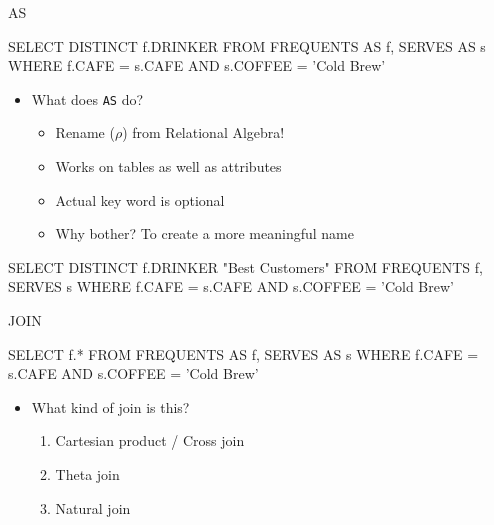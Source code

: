 \documentclass[aspectratio=169]{beamer}
\begin{document}
\begin{frame}[fragile]{AS}

\begin{SQL}
SELECT DISTINCT f.DRINKER
FROM FREQUENTS AS f, SERVES AS s
WHERE f.CAFE = s.CAFE AND s.COFFEE = 'Cold Brew'
\end{SQL}

\begin{itemize}
\item What does \texttt{AS} do?
\begin{itemize}
\item Rename ($\rho$) from Relational Algebra!
\item Works on tables as well as attributes
\item Actual key word is optional
\item Why bother? To create a more meaningful name
\end{itemize}
\end{itemize}

\begin{SQL}
SELECT DISTINCT f.DRINKER "Best Customers"
FROM FREQUENTS  f, SERVES  s
WHERE f.CAFE = s.CAFE AND s.COFFEE = 'Cold Brew'
\end{SQL}
\end{frame}


\begin{frame}[fragile]{JOIN}

\begin{SQL}
SELECT f.*
FROM FREQUENTS  AS f, SERVES  AS s
WHERE f.CAFE = s.CAFE AND s.COFFEE = 'Cold Brew'
\end{SQL}


\begin{itemize}
\item What kind of join is this? %
\begin{enumerate}[A]
\item Cartesian product / Cross join
\item Theta join
\item Natural join
\end{enumerate}

\end{itemize}
\end{frame}
\end{document}
